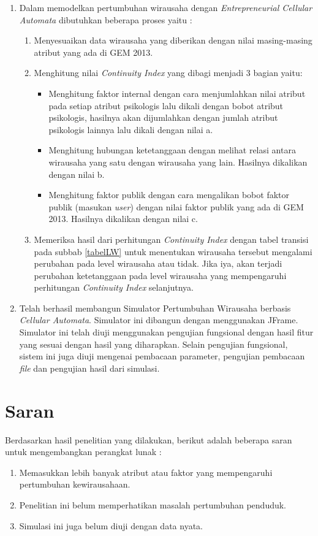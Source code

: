 \begin{enumerate}
	\item Dalam memodelkan pertumbuhan wirausaha dengan \textit{Entrepreneurial Cellular Automata} dibutuhkan beberapa proses yaitu :\\
	\begin{enumerate}
		\item Menyesuaikan data wirausaha yang diberikan dengan nilai masing-masing atribut yang ada di GEM 2013.
		\item Menghitung nilai \textit{Continuity Index} yang dibagi menjadi 3 bagian yaitu:
		\begin{itemize}
			\item Menghitung faktor internal dengan cara menjumlahkan nilai atribut pada setiap atribut psikologis lalu dikali dengan bobot atribut psikologis, hasilnya akan dijumlahkan dengan jumlah atribut psikologis lainnya lalu dikali dengan nilai a.
			\item Menghitung hubungan ketetanggaan dengan melihat relasi antara wirausaha yang satu dengan wirausaha yang lain. Hasilnya dikalikan dengan nilai b.
			\item Menghitung faktor publik dengan cara mengalikan bobot faktor publik (masukan \textit{user}) dengan nilai faktor publik yang ada di GEM 2013. Hasilnya dikalikan dengan nilai c.
		\end{itemize}
		\item Memeriksa hasil dari perhitungan \textit{Continuity Index} dengan tabel transisi pada subbab \ref{tabelLW} untuk menentukan wirausaha tersebut mengalami perubahan pada level wirausaha atau tidak. Jika iya, akan terjadi perubahan ketetanggaan pada level wirausaha yang mempengaruhi perhitungan \textit{Continuity Index} selanjutnya.
	\end{enumerate}
	\item Telah berhasil membangun Simulator Pertumbuhan Wirausaha berbasis \textit{Cellular Automata}. Simulator ini dibangun dengan menggunakan JFrame. Simulator ini telah diuji menggunakan pengujian fungsional dengan hasil fitur yang sesuai dengan hasil yang diharapkan. Selain pengujian fungsional, sistem ini juga diuji mengenai pembacaan parameter, pengujian pembacaan \textit{file} dan pengujian hasil dari simulasi.
\end{enumerate}

\section{Saran}
Berdasarkan hasil penelitian yang dilakukan, berikut adalah beberapa saran untuk mengembangkan perangkat lunak :
\begin{enumerate}
	\item Memasukkan lebih banyak atribut atau faktor yang mempengaruhi pertumbuhan kewirausahaan.
	\item Penelitian ini belum memperhatikan masalah pertumbuhan penduduk.
	\item Simulasi ini juga belum diuji dengan data nyata.
\end{enumerate}